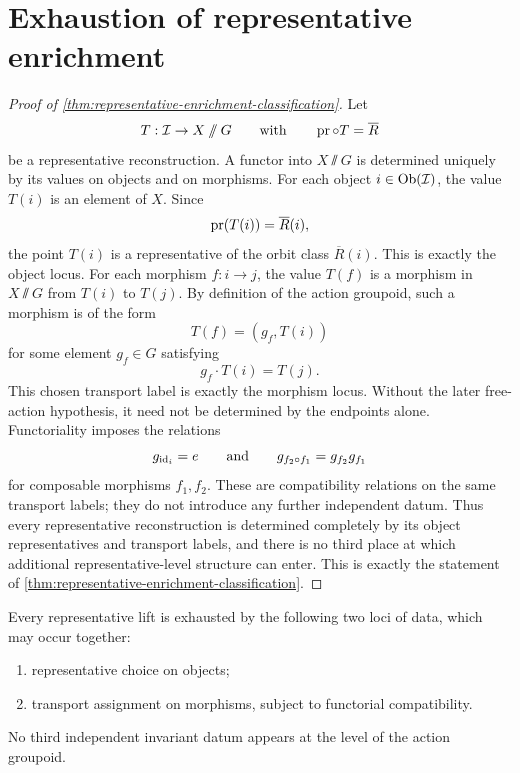 \section{Exhaustion of representative enrichment}
\begin{proof}[Proof of \cref{thm:representative-enrichment-classification}]
	Let
	\[
		T:\mathcal I\to X\mathbin{/\mkern-6mu/} G
		\qquad\text{with}\qquad
		\operatorname{pr}\circ T=\overline R
	\]
	be a representative reconstruction.
	A functor into \(X\sslash G\) is determined uniquely by its values on
	objects and on morphisms.
	For each object \(i\in\operatorname{Ob}(\mathcal I)\), the value \(T(i)\) is an
	element of \(X\).  Since
	\[
		\operatorname{pr}(T(i))=\overline R(i),
	\]
	the point \(T(i)\) is a representative of the orbit class
	\(\overline R(i)\).  This is exactly the object locus.
		For each morphism \(f:i\to j\), the value \(T(f)\) is a morphism in
		\(X\sslash G\) from \(T(i)\) to \(T(j)\).  By definition of the action
		groupoid, such a morphism is of the form
		\[
			T(f)=(g_f,T(i))
		\]
		for some element \(g_f\in G\) satisfying
		\[
			g_f\cdot T(i)=T(j).
		\]
		This chosen transport label is exactly the morphism locus. Without the
		later free-action hypothesis, it need not be determined by the
		endpoints alone.
	Functoriality imposes the relations
	\[
		g_{\operatorname{id}_i}=e
		\qquad\text{and}\qquad
		g_{f_2\circ f_1}=g_{f_2}g_{f_1}
	\]
	for composable morphisms \(f_1,f_2\).  These are compatibility
	relations on the same transport labels; they do not introduce any
	further independent datum.
	Thus every representative reconstruction is determined completely by its
	object representatives and transport labels, and there is no third
	place at which additional representative-level structure can enter.
	This is exactly the statement of
	\cref{thm:representative-enrichment-classification}.
\end{proof}
\begin{corollary}
	Every representative lift is exhausted by the following two loci of
	data, which may occur together:
	\begin{enumerate}[label=\textup{(\roman*)}]
		\item representative choice on objects;
		\item transport assignment on morphisms, subject to functorial
		      compatibility.
	\end{enumerate}
	No third independent invariant datum appears at the level of the
	action groupoid.
\end{corollary}
